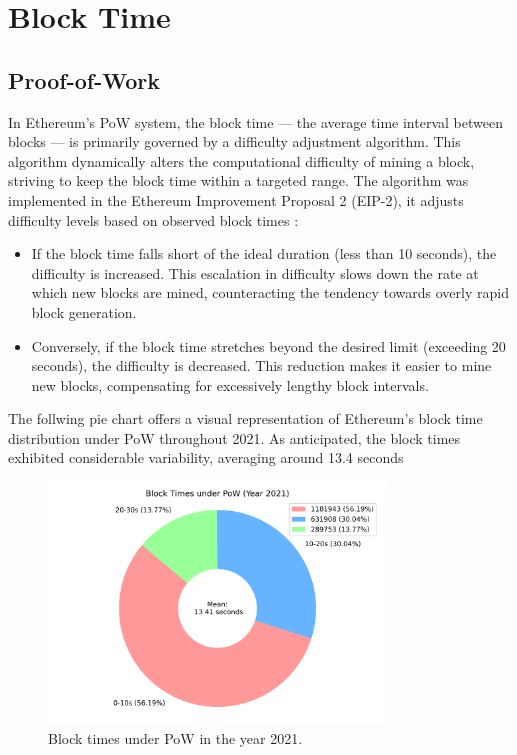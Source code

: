 \section{Block Time}

\subsection{Proof-of-Work}
\label{diff_adjustment}

In Ethereum's PoW system, the block time — the average time
interval between blocks — is primarily governed by a difficulty adjustment
algorithm. This algorithm dynamically alters the computational difficulty of
mining a block, striving to keep the block time within a targeted range.
The algorithm was implemented in the Ethereum Improvement Proposal 2 (EIP-2),
it adjusts difficulty levels based on observed block times \cite{eip-2}:

\begin{itemize}
  \item If the block time falls short of the ideal duration (less
    than 10 seconds), the difficulty is increased. This escalation in
    difficulty slows down the rate at which new blocks are mined,
    counteracting the tendency towards overly rapid block generation.

  \item Conversely, if the block time stretches beyond the desired limit (exceeding
    20 seconds), the difficulty is decreased. This reduction makes it easier to
    mine new blocks, compensating for excessively lengthy block intervals.
\end{itemize}


The follwing pie chart offers a visual representation of Ethereum's block time
distribution under PoW throughout 2021. As anticipated, the block times
exhibited considerable variability, averaging around 13.4 seconds


\begin{figure}[H]
  \centering
  \includegraphics[width=0.8\textwidth]{block_time_analysis/pow_block_time_pie_chart.png}
  \caption{Block times under PoW in the year 2021.}
  \label{fig:block_time_analysis_pow}
\end{figure}

